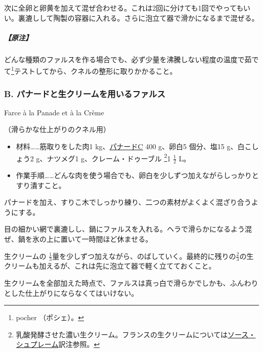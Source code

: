 \begin{recette}
次に全卵と卵黄を加えて混ぜ合わせる。これは2回に分けても1回でやってもいい。裏漉しして陶製の容器に入れる。さらに泡立て器で滑かになるまで混ぜる。

\hypertarget{nota-farce-a}{%
\subparagraph{【原注】}\label{nota-farce-a}}

どんな種類のファルスを作る場合でも、必ず少量を沸騰しない程度の温度で茹でて\footnote{pocher
  （ポシェ）。}テストしてから、クネルの整形に取りかかること。

\atoaki{}

\hypertarget{farce-b}{%
\subsubsection{B. パナードと生クリームを用いるファルス}\label{farce-b}}

\begin{frsubenv}

Farce à la Panade et à la Crème

\end{frsubenv}


（滑らかな仕上がりのクネル用）

\begin{itemize}
\item
  材料\ldots{}\ldots{}筋取りをした肉1
  kg、\protect\hyperlink{panade-c}{パナードC} 400 g、卵白5 個分、塩15
  g、白こしょう2 g、ナツメグ1 g、クレーム・ドゥーブル \footnote{乳酸発酵させた濃い生クリーム。フランスの生クリームについては\protect\hyperlink{sauce-supreme}{ソース・シュプレーム}訳注参照。}1
  \(\frac{1}{2}\) L。
\item
  作業手順\ldots{}\ldots{}どんな肉を使う場合でも、卵白を少しずつ加えながらしっかりとすり潰すこと。
\end{itemize}

パナードを加え、すりこ木でしっかり練り、二つの素材がよくよく混ざり合うようにする。

目の細かい網で裏漉しし、鍋にファルスを入れる。ヘラで滑らかになるよう混ぜ、鍋を氷の上に置いて一時間ほど休ませる。

生クリームの
\(\frac{1}{3}\)量を少しずつ加えながら、のばしていく。最終的に残りの\(\frac{2}{3}\)の生クリームも加えるが、これは先に泡立て器で軽く立てておくこと。

生クリームを全部加えた時点で、ファルスは真っ白で滑らかでしかも、ふんわりとした仕上がりにならなくてはいけない。


\end{recette}
